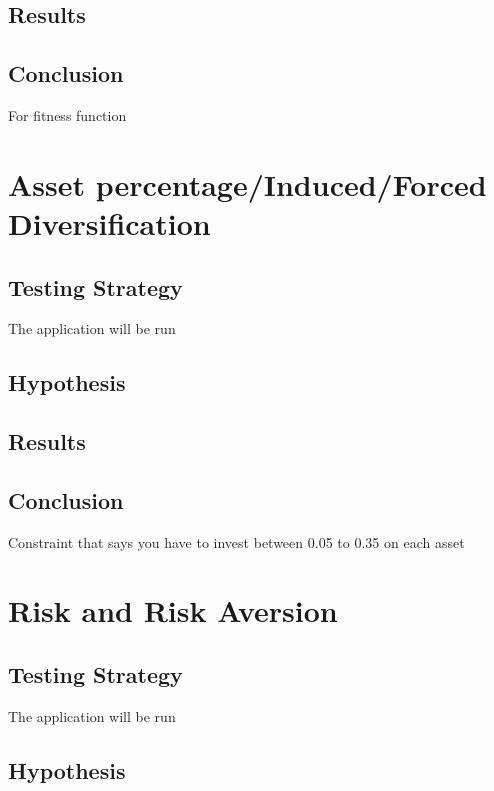 \documentclass{pdfmx4020}
\begin{document}
    \subsection{Results}

    \subsection{Conclusion}
    
    For fitness function

  \section{Asset percentage/Induced/Forced Diversification} %
  \label{sec:asset_percentage}

    \subsection{Testing Strategy}
      The application will be run

    \subsection{Hypothesis}

    \subsection{Results}

    \subsection{Conclusion}

    Constraint that says you have to invest between 0.05 to 0.35 on each asset

  \section{Risk and Risk Aversion} %
  \label{sec:risk_and_risk_aversion}

    \subsection{Testing Strategy}
      The application will be run

    \subsection{Hypothesis}
\end{document}
